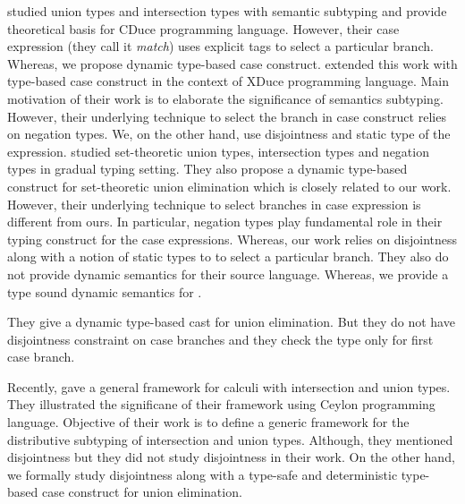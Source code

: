 \cite{frisch2002semantic} studied union types and intersection types
with semantic subtyping and provide theoretical basis for CDuce programming language.
However, their case expression (they call it \emph{match}) uses explicit
tags to select a particular branch. Whereas, we propose dynamic type-based
case construct.
\cite{castagna2005gentle} extended this work with type-based case construct
in the context of XDuce programming language. Main motivation of their
work is to elaborate the significance of semantics subtyping.
However, their underlying technique to select the branch in case construct
relies on negation types. We, on the other hand, use disjointness
and static type of the expression. 
\citet{castagna2017gradual} studied
set-theoretic union types, intersection types and negation types
in gradual typing setting. They also propose a dynamic type-based
construct for set-theoretic union elimination which is closely
related to our work.
However, their underlying technique to select branches in case
expression is different from ours.
In particular, negation types play fundamental role in their
typing construct for the case expressions.
Whereas, our work relies on disjointness along with a notion of 
static types to to select a particular branch.
They also do not provide dynamic semantics for their source language.
Whereas, we provide a type sound dynamic semantics for \cal.

They give a dynamic type-based cast for union elimination. But they do not
have disjointness constraint on case branches and they check the type
only for first case branch. 

Recently, \citet{muehlboeck2018empowering} gave a general framework for calculi
with intersection and union types. They illustrated the significane of
their framework using Ceylon programming language.
Objective of their work is to define a generic framework for the 
distributive subtyping of intersection and union types.
Although, they mentioned disjointness but they did not study disjointness
in their work. On the other hand, we formally study disjointness
along with a type-safe and deterministic type-based case construct for union elimination.

